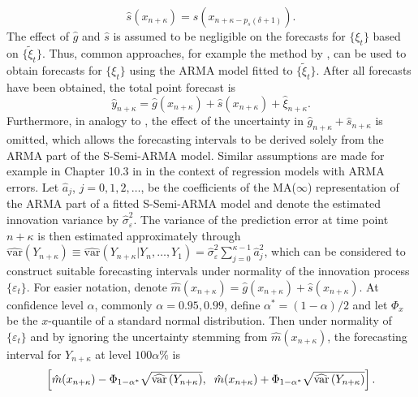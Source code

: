 \begin{equation}
\hat s(x_{n+\kappa}) = \hat s(x_{n + \kappa - p_s(\delta + 1)}).
\label{eq:sfc}
\end{equation}
The effect of \(\hat g\) and \(\hat s\) is assumed to be negligible on the forecasts for \(\{\xi_t\}\) based on \(\{\tilde \xi_t\}\). Thus, common approaches, for example the method by \citet{boxjen2008}, can be used to obtain forecasts for \(\{\xi_t\}\) using the ARMA model fitted to \(\{\tilde \xi_t\}\). After all forecasts have been obtained, the total point forecast is
\begin{equation}
\hat y_{n+\kappa} = \hat g(x_{n+\kappa}) + \hat s(x_{n+\kappa}) + \hat \xi_{n+\kappa}.
\label{eq:yfc}
\end{equation}
Furthermore, in analogy to \citet{schulz2023smoots2}, the effect of the uncertainty in \(\hat g_{n+\kappa} + \hat s_{n+\kappa}\) is omitted, which allows the forecasting intervals to be derived solely from the ARMA part of the S-Semi-ARMA model. Similar assumptions are made for example in Chapter 10.3 in \citet{hyndman2021forecasting} in the context of regression models with ARMA errors. Let \(\hat a_j\), \(j=0,1,2,\dots\), be the coefficients of the MA(\(\infty\)) representation of the ARMA part of a fitted S-Semi-ARMA model and denote the estimated innovation variance by \(\hat \sigma^2_{\varepsilon}\). The variance of the prediction error at time point \(n+\kappa\) is then estimated approximately through \(\widehat{\text{var}}\left(Y_{n+\kappa}\right)\equiv\widehat{\text{var}}\left(Y_{n+\kappa}|Y_n,\dots, Y_1\right)=\hat \sigma_\varepsilon^2\sum_{j=0}^{\kappa-1}\hat a_j^2\), which can be considered to construct suitable forecasting intervals under normality of the innovation process \(\{\varepsilon_t\}\). For easier notation, denote \(\hat m (x_{n+\kappa})=\hat g(x_{n+\kappa})+\hat s(x_{n+\kappa})\). At confidence level \(\alpha\), commonly \(\alpha=0.95,0.99\), define \(\alpha^{*}=(1-\alpha)/2\) and let \(\Phi_x\) be the \(x\)-quantile of a standard normal distribution. Then under normality of \(\{\varepsilon_t\}\) and by ignoring the uncertainty stemming from \(\hat m(x_{n+\kappa})\), the forecasting interval for \(Y_{n+\kappa}\) at level \(100\alpha\%\) is
\begin{equation}
\left[\hat m(x_{n+\kappa})-\Phi_{1-\alpha^{*}}\sqrt{\widehat{\text{var}}\left(Y_{n+\kappa}\right)}, \hspace{2mm} \hat m(x_{n+\kappa})+\Phi_{1-\alpha^{*}}\sqrt{\widehat{\text{var}}\left(Y_{n+\kappa}\right)} \right].
\label{eq:fcintnorm}
\end{equation}

